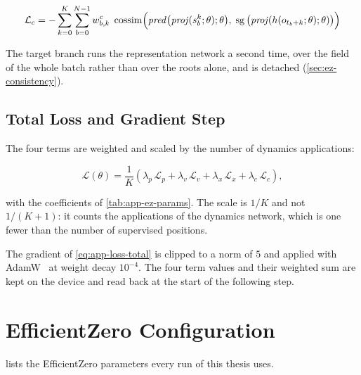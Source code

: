 \begin{equation}\label{eq:app-loss-consistency}
  \mathcal{L}_c=-\sum_{k=0}^{K}\sum_{b=0}^{N-1}w^c_{b,k}\;
  \operatorname{cossim}\!\Big(
    \mathit{pred}\big(\mathit{proj}(s^k_b;\theta);\theta\big),\;
    \operatorname{sg}\big(\mathit{proj}(h(o_{t_b+k};\theta);\theta)\big)
  \Big)
\end{equation}

The target branch runs the representation network a second time, over the 
field of the whole batch rather than over the roots alone, and is detached
(\cref{sec:ez-consistency}).

\section{Total Loss and Gradient Step}\label{sec:app-loss-total}

The four terms are weighted and scaled by the number of dynamics applications:

\begin{equation}\label{eq:app-loss-total}
  \mathcal{L}(\theta)=\frac{1}{K}\left(
    \lambda_p\,\mathcal{L}_p+\lambda_v\,\mathcal{L}_v
    +\lambda_x\,\mathcal{L}_x+\lambda_c\,\mathcal{L}_c\right),
\end{equation}

with the coefficients of \cref{tab:app-ez-params}.
The scale is $1/K$ and not $1/(K+1)$: it counts the applications of the dynamics network, which is
one fewer than the number of supervised positions.

The gradient of \cref{eq:app-loss-total} is clipped to a norm of $5$ and applied with
AdamW~\cite{adamw} at weight decay $10^{-4}$.
The four term values and their weighted sum are kept on the device and read
back at the start of the following step.

\chapter{EfficientZero Configuration}\label{app:configuration}

 lists the EfficientZero parameters every run of this thesis uses.

